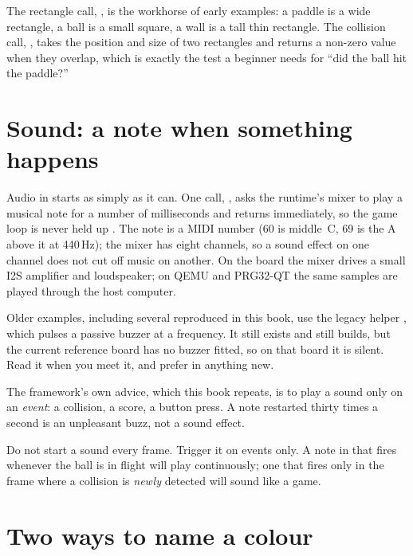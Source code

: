 The rectangle call, , is the workhorse of early examples:
a paddle is a wide rectangle, a ball is a small square, a wall is a tall thin
rectangle. The collision call, , takes the position
and size of two rectangles and returns a non-zero value when they overlap, which
is exactly the test a beginner needs for ``did the ball hit the paddle?''

\section{Sound: a note when something happens}

Audio in \prg starts as simply as it can. One call,
, asks the
runtime's mixer to play a musical note for a number of milliseconds and returns
immediately, so the game loop is never held up \citep{prg32abi}. The note is a
MIDI number (60 is middle~C, 69 is the A above it at 440\,Hz); the mixer has
eight channels, so a sound effect on one channel does not cut off music on
another. On the board the mixer drives a small I2S amplifier and loudspeaker; on
QEMU and PRG32-QT the same samples are played through the host computer.

Older examples, including several reproduced in this book, use the legacy helper
, which pulses a passive buzzer at a
frequency. It still exists and still builds, but the current reference board has
no buzzer fitted, so on that board it is silent. Read it when you meet it, and
prefer  in anything new.

The framework's own advice, which this book repeats, is to play a sound only on
an \emph{event}: a collision, a score, a button press. A note restarted thirty
times a second is an unpleasant buzz, not a sound effect.

\begin{prgwarn}
Do not start a sound every frame. Trigger it on events only. A note in
 that fires whenever the ball is in flight will play continuously;
one that fires only in the frame where a collision is \emph{newly} detected will
sound like a game.
\end{prgwarn}

\section{Two ways to name a colour}

